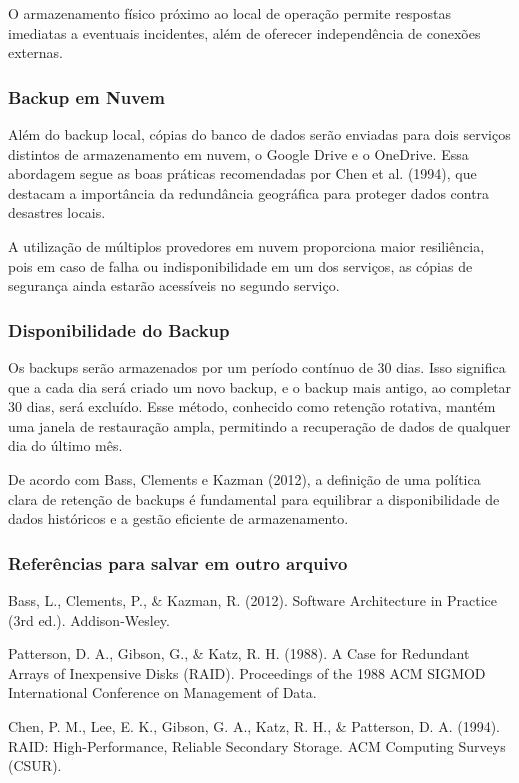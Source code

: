 \documentclass[../main.tex]{subfiles}
\begin{document}
    O armazenamento físico próximo ao local de operação permite respostas imediatas a eventuais incidentes, além de oferecer 
    independência de conexões externas.

    \subsubsection{Backup em Nuvem}

    Além do backup local, cópias do banco de dados serão enviadas para dois serviços distintos de armazenamento em nuvem, o 
    Google Drive e o OneDrive. Essa abordagem segue as boas práticas recomendadas por Chen et al. (1994), que destacam a 
    importância da redundância geográfica para proteger dados contra desastres locais.

    A utilização de múltiplos provedores em nuvem proporciona maior resiliência, pois em caso de falha ou indisponibilidade 
    em um dos serviços, as cópias de segurança ainda estarão acessíveis no segundo serviço.

    \subsubsection{Disponibilidade do Backup}

    Os backups serão armazenados por um período contínuo de 30 dias. Isso significa que a cada dia será criado um novo 
    backup, e o backup mais antigo, ao completar 30 dias, será excluído. Esse método, conhecido como retenção rotativa, 
    mantém uma janela de restauração ampla, permitindo a recuperação de dados de qualquer dia do último mês.

    De acordo com Bass, Clements e Kazman (2012), a definição de uma política clara de retenção de backups é fundamental 
    para equilibrar a disponibilidade de dados históricos e a gestão eficiente de armazenamento.
    
    \subsubsection{Referências para salvar em outro arquivo}
    Bass, L., Clements, P., \& Kazman, R. (2012). Software Architecture in Practice (3rd ed.). Addison-Wesley.

    Patterson, D. A., Gibson, G., \& Katz, R. H. (1988). A Case for Redundant Arrays of Inexpensive Disks (RAID). Proceedings of the 1988 ACM SIGMOD International Conference on Management of Data.

    Chen, P. M., Lee, E. K., Gibson, G. A., Katz, R. H., \& Patterson, D. A. (1994). RAID: High-Performance, Reliable Secondary Storage. ACM Computing Surveys (CSUR).
    
\end{document}
